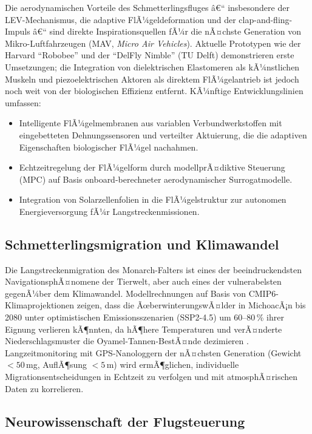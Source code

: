 ﻿\documentclass[a4paper,12pt]{article}
\theoremstyle{definition}
\begin{document}
	Die aerodynamischen Vorteile des Schmetterlingsfluges â€“ insbesondere der
	LEV-Mecha\-nismus, die adaptive FlÃ¼geldeformation und der clap-and-fling-Impuls â€“
	sind direkte Inspirationsquellen fÃ¼r die nÃ¤chste Generation von
	Mikro-Luftfahrzeugen (MAV, \textit{Micro Air Vehicles}).
	Aktuelle Prototypen wie der Harvard ``Robobee'' \cite{wood2008first}
	und der ``DelFly Nimble'' (TU Delft) demonstrieren erste Umsetzungen;
	die Integration von dielektrischen Elastomeren als kÃ¼nstlichen Muskeln
	und piezoelektrischen Aktoren als direktem FlÃ¼gelantrieb ist jedoch noch weit
	von der biologischen Effizienz entfernt.
	KÃ¼nftige Entwicklungslinien umfassen:
	\begin{itemize}
		\item Intelligente FlÃ¼gelmembranen aus variablen Verbundwerkstoffen mit
		eingebetteten Dehnungssensoren und verteilter Aktuierung,
		die die adaptiven Eigenschaften biologischer FlÃ¼gel nachahmen.
		\item Echtzeitregelung der FlÃ¼gelform durch modellprÃ¤diktive Steuerung
		(MPC) auf Basis onboard-berechneter aerodynamischer Surrogatmodelle.
		\item Integration von Solarzellenfolien in die FlÃ¼gelstruktur zur
		autonomen Energieversorgung fÃ¼r Langstreckenmissionen.
	\end{itemize}
	
	\subsection{Schmetterlingsmigration und Klimawandel}
	
	Die Langstreckenmigration des Monarch-Falters ist eines der beeindruckendsten
	NavigationsphÃ¤nomene der Tierwelt, aber auch eines der vulnerabelsten gegenÃ¼ber
	dem Klimawandel.
	Modellrechnungen auf Basis von CMIP6-Klimaprojektionen zeigen,
	dass die ÃœberwinterungswÃ¤lder in MichoacÃ¡n bis 2080 unter optimistischen
	Emissionsszenarien (SSP2-4.5) um 60--80\,\% ihrer Eignung verlieren kÃ¶nnten,
	da hÃ¶here Temperaturen und verÃ¤nderte Niederschlagsmuster die
	Oyamel-Tannen-BestÃ¤nde dezimieren \cite{oberhauser2004monarch}.
	Langzeitmonitoring mit GPS-Nanologgern der nÃ¤chsten Generation
	(Gewicht $< 50$\,mg, AuflÃ¶sung $< 5$\,m) wird ermÃ¶glichen,
	individuelle Migrationsentscheidungen in Echtzeit zu verfolgen und
	mit atmosphÃ¤rischen Daten zu korrelieren.
	
	\subsection{Neurowissenschaft der Flugsteuerung}
	
\end{document}
